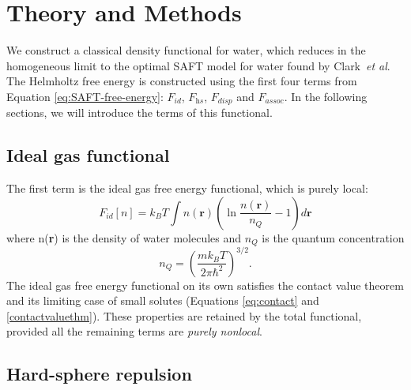 \documentclass[letterpaper,twocolumn,amsmath,amssymb,prb]{revtex4-1}
\newcommand{\xx}{\textbf{r}}
\begin{document}
\section{Theory and Methods}
We construct a classical density functional for water, which reduces
in the homogeneous limit to the optimal SAFT model for water found by
Clark~\emph{et al}.  The Helmholtz free energy is constructed using the
first four terms from Equation \ref{eq:SAFT-free-energy}: $F_\textit{id}$,
$F_\textit{hs}$, $F_\textit{disp}$ and $F_\textit{assoc}$.  In the
following sections, we will introduce the terms of this functional.

\subsection{Ideal gas functional}
The first term is the ideal gas free energy functional, which is
purely local:
\begin{equation}\label{idealgas}
  F_{id}[n] = k_B T \int n(\xx)\left( \ln{\frac{n(\xx)}{n_Q}} - 1\right) d\xx
\end{equation}
where n(\xx) is the density of water molecules and $n_Q$ is the
quantum concentration
\begin{equation}\label{quantumconcentration}
 n_Q =\left(\frac{mk_BT}{2\pi\hbar^2}\right)^{3/2}.
\end{equation}
The ideal gas free energy functional on its own satisfies the contact
value theorem and its limiting case of small solutes (Equations
\ref{eq:contact} and \ref{contactvaluethm}). These properties are
retained by the total functional, provided all the remaining terms are
\emph{purely nonlocal}.

\subsection{Hard-sphere repulsion}
\end{document}
